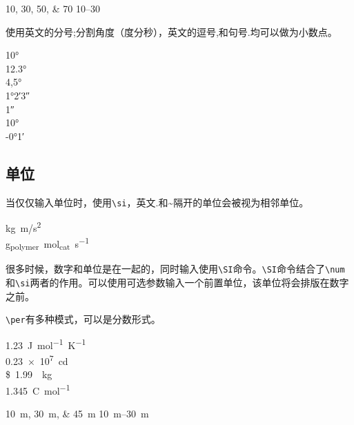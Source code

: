 
\begin{codeshow}
\numlist{10;30;50;70}
\numrange{10}{30}
\end{codeshow}


使用英文的分号;分割角度（度分秒），英文的逗号,和句号.均可以做为小数点。

\begin{codeshow}
\ang{10} \\
\ang{12.3} \\
\ang{4,5} \\
\ang{1;2;3} \\
\ang{;;1} \\
\ang{+10;;} \\
\ang{-0;1;}
\end{codeshow}

\subsection{单位}

当仅仅输入单位时，使用\lstinline|\si|，英文.和\~{}隔开的单位会被视为相邻单位。

\begin{codeshow}
\si{kg.m/s^2} \\
\si{g_{polymer}~mol_{cat}.s^{-1}}
\end{codeshow}

很多时候，数字和单位是在一起的，同时输入使用\lstinline|\SI|命令。\lstinline|\SI|命令结合了\lstinline|\num|和\lstinline|\si|两者的作用。可以使用可选参数输入一个前置单位，该单位将会排版在数字之前。


\lstinline|\per|有多种模式，可以是分数形式。

\begin{codeshow}
\SI[mode=text]{1.23}{J.mol^{-1}.K^{-1}} \\
\SI{.23e7}{\candela} \\
\SI[per-mode=symbol]{1.99}[\$]{\per\kilogram} \\
\SI[per-mode=fraction]{1,345}{\coulomb\per\mole}
\end{codeshow}


\begin{codeshow}
\SIlist{10;30;45}{\metre}
\SIrange{10}{30}{\metre}
\end{codeshow}

